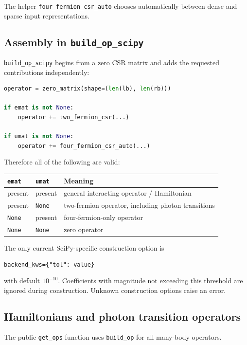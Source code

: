 \documentclass[11pt]{article}
\begin{document}
The helper \texttt{four\_fermion\_csr\_auto} chooses automatically between dense and sparse input representations.

\subsection{Assembly in \texttt{build\_op\_scipy}}

\texttt{build\_op\_scipy} begins from a zero CSR matrix and adds the requested contributions independently:

\begin{lstlisting}[language=Python]
operator = zero_matrix(shape=(len(lb), len(rb)))

if emat is not None:
    operator += two_fermion_csr(...)

if umat is not None:
    operator += four_fermion_csr_auto(...)
\end{lstlisting}

Therefore all of the following are valid:

\begin{center}
\begin{tabular}{lll}
\toprule
\texttt{emat} & \texttt{umat} & Meaning \\
\midrule
present & present & general interacting operator / Hamiltonian \\
present & \texttt{None} & two-fermion operator, including photon transitions \\
\texttt{None} & present & four-fermion-only operator \\
\texttt{None} & \texttt{None} & zero operator \\
\bottomrule
\end{tabular}
\end{center}

The only current SciPy-specific construction option is

\begin{lstlisting}
backend_kws={"tol": value}
\end{lstlisting}

with default \(10^{-10}\).  Coefficients with magnitude not exceeding this threshold are ignored during construction.  Unknown construction options raise an error.

\subsection{Hamiltonians and photon transition operators}

The public \texttt{get\_ops} function uses \texttt{build\_op} for all many-body operators.
\end{document}
